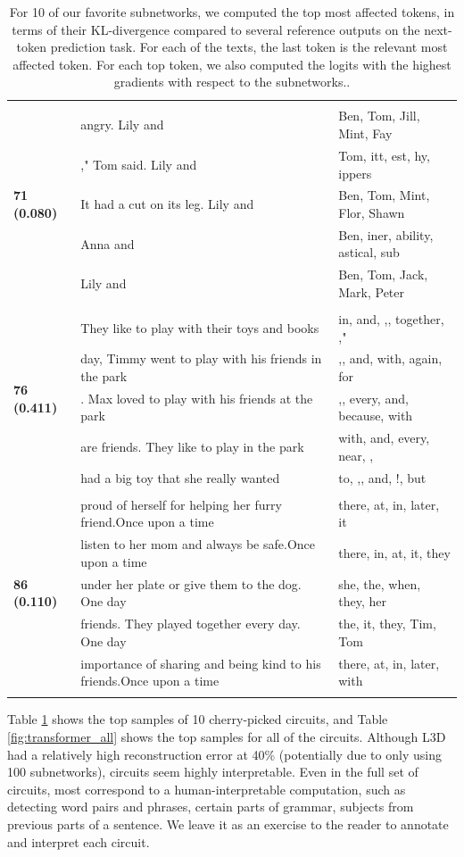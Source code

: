 \documentclass{article}
\theoremstyle{plain}
\theoremstyle{definition}
\theoremstyle{remark}
\begin{document}
\begin{longtable}{|p{}|p{}|p{}|}
& & \\
\multirow{5}{*}{\textbf{71 (0.080)}} & angry.  Lily and & Ben,  Tom,  Jill,  Mint,  Fay \\
& ," Tom said.  Lily and & Tom, itt, est, hy, ippers \\
& It had a cut on its leg. Lily and & Ben,  Tom,  Mint,  Flor,  Shawn \\
& Anna and & Ben, iner, ability, astical, sub \\
& Lily and & Ben,  Tom,  Jack,  Mark,  Peter \\
& & \\
\multirow{5}{*}{\textbf{76 (0.411)}} & They like to play with their toys and books & in,  and, ,,  together, ," \\
& day, Timmy went to play with his friends in the park & ,,  and,  with,  again,  for \\
& . Max loved to play with his friends at the park & ,,  every,  and,  because,  with \\
& are friends. They like to play in the park & with,  and,  every,  near, , \\
& had a big toy that she really wanted & to, ,,  and, !,  but \\
& & \\
\multirow{5}{*}{\textbf{86 (0.110)}} & proud of herself for helping her furry friend.Once upon a time & there,  at,  in,  later,  it \\
& listen to her mom and always be safe.Once upon a time & there,  in,  at,  it,  they \\
& under her plate or give them to the dog.  One day & she,  the,  when,  they,  her \\
& friends. They played together every day.  One day & the,  it,  they,  Tim,  Tom \\
& importance of sharing and being kind to his friends.Once upon a time & there,  at,  in,  later,  with \\
\caption{For 10 of our favorite subnetworks, we computed the top most affected tokens, in terms of their KL-divergence compared to several reference outputs on the next-token prediction task. For each of the texts, the last token is the relevant most affected token. For each top token, we also computed the logits with the highest gradients with respect to the subnetworks..}\label{tab:transformer_fav}
\end{longtable}
\twocolumn
\normalsize

Table \ref{tab:transformer_fav} shows the top samples of 10 cherry-picked circuits, and Table \ref{fig:transformer_all} shows the top samples for all of the circuits. Although L3D had a relatively high reconstruction error at 40\% (potentially due to only using 100 subnetworks), circuits seem highly interpretable. Even in the full set of circuits, most correspond to a human-interpretable computation, such as detecting word pairs and phrases, certain parts of grammar, subjects from previous parts of a sentence. We leave it as an exercise to the reader to annotate and interpret each circuit.  
\end{document}
